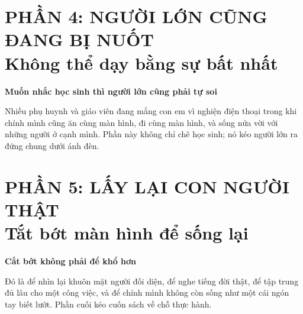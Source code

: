 \documentclass[14pt,a4paper,twoside]{extbook}
\newcommand{\partintro}[2]{%
  \begin{center}
    \begin{minipage}{0.86\textwidth}
    \begin{tcolorbox}[
      colback=bookbg,
      colframe=booksecondary,
      boxrule=0.8pt,
      arc=4pt,
      enhanced,
      left=8pt,right=8pt,top=8pt,bottom=8pt
    ]
    {\centering\bfseries\color{bookprimary}#1\par}
    \vspace{5pt}
    {\small #2}
    \end{tcolorbox}
    \end{minipage}
  \end{center}
  \vspace{8pt}
}
\begin{document}
\part*{PHẦN 4: NGƯỜI LỚN CŨNG ĐANG BỊ NUỐT\\\large Không thể dạy bằng sự bất nhất}
\partintro{Muốn nhắc học sinh thì người lớn cũng phải tự soi}{Nhiều phụ huynh và giáo viên đang mắng con em vì nghiện điện thoại trong khi chính mình cũng ăn cùng màn hình, đi cùng màn hình, và sống nửa vời với những người ở cạnh mình. Phần này không chỉ chê học sinh; nó kéo người lớn ra đứng chung dưới ánh đèn.}





\part*{PHẦN 5: LẤY LẠI CON NGƯỜI THẬT\\\large Tắt bớt màn hình để sống lại}
\partintro{Cắt bớt không phải để khổ hơn}{Đó là để nhìn lại khuôn mặt người đối diện, để nghe tiếng đời thật, để tập trung đủ lâu cho một công việc, và để chính mình không còn sống như một cái ngón tay biết lướt. Phần cuối kéo cuốn sách về chỗ thực hành.}



\backmatter






\end{document}
